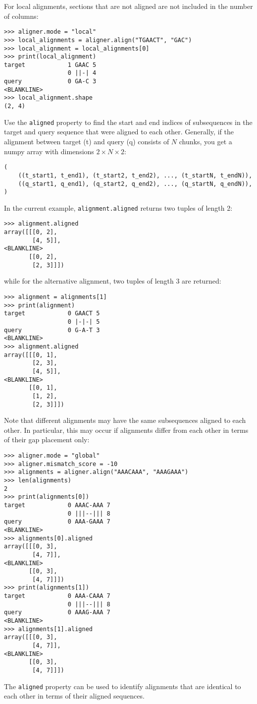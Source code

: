 For local alignments, sections that are not aligned are not included in the number of columns:
\begin{verbatim}
>>> aligner.mode = "local"
>>> local_alignments = aligner.align("TGAACT", "GAC")
>>> local_alignment = local_alignments[0]
>>> print(local_alignment)
target            1 GAAC 5
                  0 ||-| 4
query             0 GA-C 3
<BLANKLINE>
>>> local_alignment.shape
(2, 4)
\end{verbatim}

Use the \verb+aligned+ property to find the start and end indices of subsequences in the target and query sequence that were aligned to each other.
Generally, if the alignment between target (t) and query (q) consists of $N$
chunks, you get a numpy array with dimensions $2 \times N \times 2$:

\begin{verbatim}
(
    ((t_start1, t_end1), (t_start2, t_end2), ..., (t_startN, t_endN)),
    ((q_start1, q_end1), (q_start2, q_end2), ..., (q_startN, q_endN)),
)
\end{verbatim}

In the current example, \verb+alignment.aligned+ returns two tuples of length 2:

\begin{verbatim}
>>> alignment.aligned
array([[[0, 2],
        [4, 5]],
<BLANKLINE>
       [[0, 2],
        [2, 3]]])
\end{verbatim}
while for the alternative alignment, two tuples of length 3 are returned:

\begin{verbatim}
>>> alignment = alignments[1]
>>> print(alignment)
target            0 GAACT 5
                  0 |-|-| 5
query             0 G-A-T 3
<BLANKLINE>
>>> alignment.aligned
array([[[0, 1],
        [2, 3],
        [4, 5]],
<BLANKLINE>
       [[0, 1],
        [1, 2],
        [2, 3]]])
\end{verbatim}
Note that different alignments may have the same subsequences aligned to each other. In particular, this may occur if alignments differ from each other in terms of their gap placement only:

\begin{verbatim}
>>> aligner.mode = "global"
>>> aligner.mismatch_score = -10
>>> alignments = aligner.align("AAACAAA", "AAAGAAA")
>>> len(alignments)
2
>>> print(alignments[0])
target            0 AAAC-AAA 7
                  0 |||--||| 8
query             0 AAA-GAAA 7
<BLANKLINE>
>>> alignments[0].aligned
array([[[0, 3],
        [4, 7]],
<BLANKLINE>
       [[0, 3],
        [4, 7]]])
>>> print(alignments[1])
target            0 AAA-CAAA 7
                  0 |||--||| 8
query             0 AAAG-AAA 7
<BLANKLINE>
>>> alignments[1].aligned
array([[[0, 3],
        [4, 7]],
<BLANKLINE>
       [[0, 3],
        [4, 7]]])
\end{verbatim}
The \verb+aligned+ property can be used to identify alignments that are identical to each other in terms of their aligned sequences.

